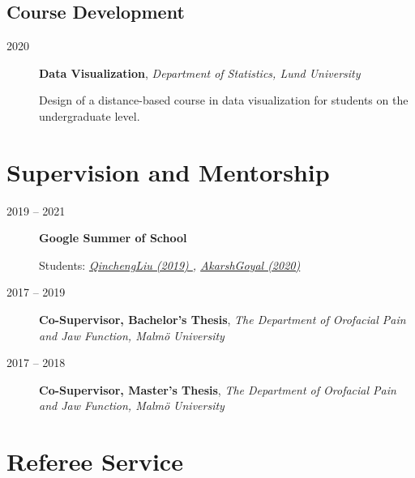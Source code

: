 \documentclass[
  10pt,
  headsepline=true,
  english,
  DIV=12
]{scrartcl}
\renewcommand*{%
  \mkbibnamegiven
}[1]{\ifitemannotation{highlight}{\textbf{#1}}{#1}}
\renewcommand*{%
  \mkbibnamefamily
}[1]{\ifitemannotation{highlight}{\textbf{#1}}{#1}}
\begin{document}
\subsection{Course Development}

\begin{description}
  \item[2020]{
        \textbf{Data Visualization}, \emph{Department of Statistics, Lund
          University}

        Design of a distance-based course in data visualization for students on
        the undergraduate level.
        }
\end{description}

\hypertarget{supervision}{%
  \section{Supervision and Mentorship}\label{supervision}}

\begin{description}
  \item[2019 -- 2021]{
        \textbf{Google Summer of School}

        Students:
        \emph{
          \href{
            https://summerofcode.withgoogle.com/archive/2019/projects/4654960430546944/
          }{
            QinchengLiu (2019)
          },
          \href{
            https://summerofcode.withgoogle.com/dashboard/project/5459519376719872/overview
          }{
            AkarshGoyal (2020)
          }
        }
        }
  \item[2017 -- 2019] {
        \textbf{Co-Supervisor, Bachelor's Thesis}, \emph{The Department of
          Orofacial Pain and Jaw Function, Malmö University}

        }
  \item[2017 -- 2018] {
        \textbf{Co-Supervisor, Master's Thesis}, \emph{The Department of
          Orofacial Pain and Jaw Function, Malmö University}

        }
\end{description}

\hypertarget{reviewer}{%
  \section{Referee Service}\label{reviewer}}
\end{document}
